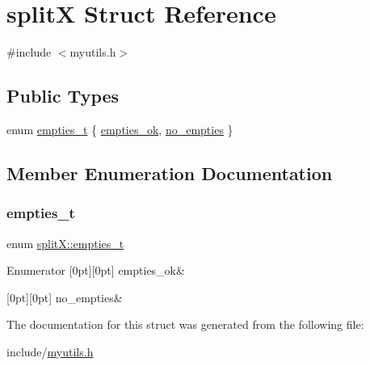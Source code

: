 \hypertarget{structsplit_x}{}\section{splitX Struct Reference}
\label{structsplit_x}


{\ttfamily \#include $<$myutils.\+h$>$}

\subsection*{Public Types}
\begin{DoxyCompactItemize}
\item 
enum \mbox{\hyperlink{structsplit_x_a65d2638d2c3bd79a7229d6991969199d}{empties\+\_\+t}} \{ \mbox{\hyperlink{structsplit_x_a65d2638d2c3bd79a7229d6991969199daf2f0a1a585ae5ecb7dc1f90a2feed23d}{empties\+\_\+ok}}, 
\mbox{\hyperlink{structsplit_x_a65d2638d2c3bd79a7229d6991969199da058c2dde66da6d88ebeb9b97866e62fd}{no\+\_\+empties}}
 \}
\end{DoxyCompactItemize}


\subsection{Member Enumeration Documentation}
\mbox{\label{structsplit_x_a65d2638d2c3bd79a7229d6991969199d}} 
\subsubsection{\texorpdfstring{empties\_t}{empties\_t}}
{\footnotesize\ttfamily enum \mbox{\hyperlink{structsplit_x_a65d2638d2c3bd79a7229d6991969199d}{split\+X\+::empties\+\_\+t}}}

\begin{DoxyEnumFields}{Enumerator}
[0pt][0pt]{}\mbox{\label{structsplit_x_a65d2638d2c3bd79a7229d6991969199daf2f0a1a585ae5ecb7dc1f90a2feed23d}} 
empties\+\_\+ok&\\
\hline

[0pt][0pt]{}\mbox{\label{structsplit_x_a65d2638d2c3bd79a7229d6991969199da058c2dde66da6d88ebeb9b97866e62fd}} 
no\+\_\+empties&\\
\hline

\end{DoxyEnumFields}


The documentation for this struct was generated from the following file\+:\begin{DoxyCompactItemize}
\item 
include/\mbox{\hyperlink{myutils_8h}{myutils.\+h}}\end{DoxyCompactItemize}

